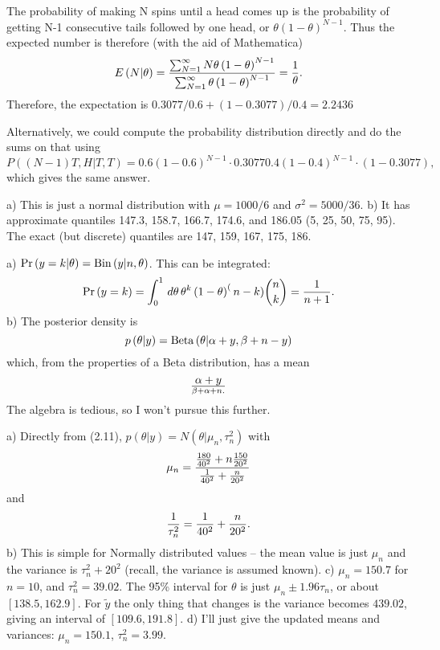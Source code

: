 The probability of making N spins until a head comes up is the probability of
getting N-1 consecutive tails followed by one head, or $\theta \left(1 - \theta\right)^{N-1}$.
Thus the expected number is therefore (with the aid of Mathematica)
$$
 E\left(N | \theta\right) = {\sum_{N=1}^\infty N \theta \left(1-\theta\right)^{N-1} \over
  \sum_{N=1}^\infty \theta \left(1 - \theta\right)^{N-1}} = {1 \over \theta}.
$$
Therefore, the expectation is $0.3077 / 0.6 + \left(1-0.3077\right) / 0.4 = 2.2436$

Alternatively, we could compute the probability distribution directly and do the sums on
that using
$$
 P\left( \left(N-1\right) T, H | T, T \right) = 0.6 \left(1-0.6\right)^{N-1} \cdot 0.3077
  0.4 \left(1 - 0.4\right)^{N-1} \cdot \left(1 - 0.3077\right),
$$
which gives the same answer.

\vskip 0.2in
 \hfil \break
a) This is just a normal distribution with $\mu = 1000 / 6$ and $\sigma^2 = 5000 / 36$.\hfil\break
b) It has approximate quantiles 147.3, 158.7, 166.7, 174.6, and 186.05 (5, 25, 50, 75, 95).
  The exact (but discrete) quantiles are 147, 159, 167, 175, 186.
  
\vskip 0.2in
 \hfil \break
a) ${\rm Pr}\left(y = k | \theta\right) = {\rm Bin}\left(y | n, \theta\right)$.  This
can be integrated:
$$
  {\rm Pr}\left(y = k\right) = \int_0^1 \, d\theta \, \theta^k \left(1 - \theta\right)^(n - k)
    {n \choose k} = {1 \over n + 1}.
$$
b) The posterior density is 
$$
 p\left(\theta | y\right) = {\rm Beta}\left(\theta | \alpha + y, \beta + n - y\right)
$$
which, from the properties of a Beta distribution, has a mean
$$
  \alpha + y \over \beta + \alpha + n .
$$
The algebra is tedious, so I won't pursue this further.

\vskip 0.2in
 \hfil \break
a) Directly from (2.11), $p\left(\theta | y\right) = N\left(\theta | \mu_n, \tau^2_n\right)$
with
$$
 \mu_n = {{180 \over 40^2} + n {150 \over 20^2} \over {1 \over 40^2} + {n \over 20^2}}
$$
and
$$
 {1 \over \tau_n^2} = {1 \over 40^2} + {n \over 20^2}.
$$
b) This is simple for Normally distributed values -- the mean value is just $\mu_n$
and the variance is $\tau^2_n + 20^2$ (recall, the variance is assumed known).\hfil\break
c) $\mu_n = 150.7$ for $n=10$, and $\tau^2_n = 39.02$.  The 95\% interval
  for $\theta$ is just $\mu_n \pm 1.96 \tau_n$, or about $\left[138.5, 162.9\right]$.
 For $\tilde{y}$ the only thing that changes is the variance becomes $439.02$,
  giving an interval of $\left[109.6, 191.8\right]$.\hfil\break
d) I'll just give the updated means and variances: $\mu_n = 150.1$,
 $\tau^2_n = 3.99$.
 
